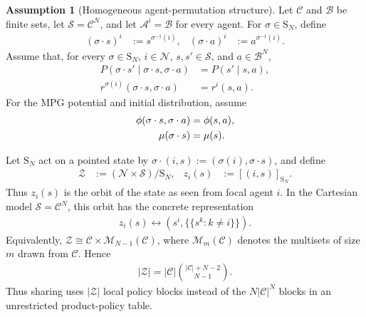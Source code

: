\documentclass{article}
\theoremstyle{plain}
\theoremstyle{definition}
\newtheorem{assumption}[theorem]{Assumption}
\theoremstyle{remark}
\newcommand{\N}{\mathcal{N}}
\newcommand{\St}{\mathcal{S}}
\newcommand{\Ac}{\mathcal{A}}
\newcommand{\abs}[1]{\left\lvert#1\right\rvert}
\newcommand{\orbit}[1]{[#1]}
\newcommand{\Sym}{\mathrm{S}}
\begin{document}
\begin{assumption}[Homogeneous agent-permutation structure]
\label{assumption:permutation-structure}
Let $\mathcal C$ and $\mathcal B$ be finite sets, let
$\St=\mathcal C^N$, and let $\Ac^i=\mathcal B$ for every agent. For
$\sigma\in\Sym_N$, define
\begin{align*}
  (\sigma\mathbin{\cdot}s)^i
  &:=
  s^{\sigma^{-1}(i)},&
  (\sigma\mathbin{\cdot}a)^i
  &:=
  a^{\sigma^{-1}(i)}.
\end{align*}
Assume that, for every $\sigma\in\Sym_N$, $i\in\N$, $s,s'\in\St$, and
$a\in\mathcal B^N$,
\begin{align}
  P(\sigma\mathbin{\cdot}s'\mid
    \sigma\mathbin{\cdot}s,\sigma\mathbin{\cdot}a)
  &=
  P(s'\mid s,a),
  \label{eq:perm-transition}\\
  r^{\sigma(i)}(\sigma\mathbin{\cdot}s,\sigma\mathbin{\cdot}a)
  &=
  r^i(s,a).
  \label{eq:perm-reward}
\end{align}
For the MPG potential and initial distribution, assume
\begin{align}
  \phi(\sigma\mathbin{\cdot}s,\sigma\mathbin{\cdot}a)
  &=
  \phi(s,a),
  \notag\\
  \mu(\sigma\mathbin{\cdot}s)
  &=
  \mu(s).
  \label{eq:perm-mu}
\end{align}
\end{assumption}

Let $\Sym_N$ act on a pointed state by
$\sigma\mathbin{\cdot}(i,s):=(\sigma(i),\sigma\mathbin{\cdot}s)$, and define
\begin{align*}
  \mathcal Z
  &:=
  (\N\times\St)/\Sym_N,&
  z_i(s)
  &:=
  \orbit{(i,s)}_{\Sym_N}.
\end{align*}
Thus $z_i(s)$ is the orbit of the state as seen from focal agent $i$.  In the
Cartesian model $\St=\mathcal C^N$, this orbit has the concrete representation
\begin{align*}
  z_i(s)
  \longleftrightarrow
  \left(s^i,\{\!\{s^k:k\ne i\}\!\}\right).
\end{align*}
Equivalently,
$\mathcal Z\cong
\mathcal C\times\mathcal M_{N-1}(\mathcal C)$, where
$\mathcal M_m(\mathcal C)$ denotes the multisets of size $m$ drawn from
$\mathcal C$.  Hence
\begin{align*}
  \abs{\mathcal Z}
  =
  \abs{\mathcal C}
  \binom{\abs{\mathcal C}+N-2}{N-1}.
\end{align*}
Thus sharing uses $\abs{\mathcal Z}$ local policy blocks instead of the
$N\abs{\mathcal C}^N$ blocks in an unrestricted product-policy table.
\end{document}
